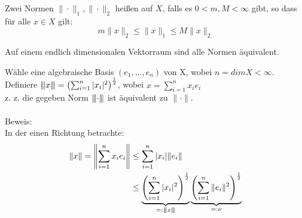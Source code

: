 \begin{definition}
	Zwei Normen $\| \cdot \|_{1}, \| \cdot \|_{2}$ hei{\ss}en  auf $X$, falls es $0 < m, M < \infty$ gibt, so dass für alle $ x \in X$ gilt:
	\[ m \| x \|_{2} \leq \| x \|_{1} \leq M \| x \|_{2} \]
\end{definition}
 
\begin{satz} 
	Auf einem endlich dimensionalen Vektorraum sind alle Normen äquivalent.
\end{satz}
\begin{beweis}
	Wähle eine algebraische Basis $(e_{1}, \dotsc, e_{n})$ von X, wobei $ n = dim X < \infty$. \\
	Definiere $ {\left\vert\kern-0.25ex\left\vert\kern-0.25ex\left\vert x\right\vert\kern-0.25ex\right\vert\kern-0.25ex\right\vert} = \left(\sum_{i = 1}^{n} |x_{i}|^2\right)^{\frac{1}{2}}$, wobei $x = \sum_{i = 1}^{n} x_{i} e_{i}$ \\
	
	z. z. die gegeben Norm ${\left\vert\kern-0.25ex\left\vert\kern-0.25ex\left\vert \cdot \right\vert\kern-0.25ex\right\vert\kern-0.25ex\right\vert}$ ist äquivalent zu $\| \cdot \|$. \\ \\
	Beweis: \\
	In der einen Richtung betrachte: 
	\begin{align*}
		\| x \| = \left\| \sum_{i = 1}^{n} x_{i} e_{i} \right\| & \leq \sum_{i = 1}^{n} |x_{i}| \|  e_{i} \| \\ 
													& \leq \underbrace{ \left( \sum_{i = 1}^{n} |x_{i}|^{2} \right)^\frac{1}{2} }_{=: {\left\vert\kern-0.25ex\left\vert\kern-0.25ex\left\vert x \right\vert\kern-0.25ex\right\vert\kern-0.25ex\right\vert}} \underbrace{ \left( \sum_{i = 1}^{n} \| e_{i} \|^{2} \right)^\frac{1}{2} }_{=: \nu}
	\end{align*}
	

\end{beweis}
